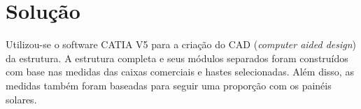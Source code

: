 
\section{Solução}

Utilizou-se o software CATIA V5 para a criação do CAD (\textit{computer aided design}) da estrutura. A estrutura completa e seus módulos separados foram construídos com base nas medidas das caixas comerciais e hastes selecionadas. Além disso, as medidas também foram baseadas para seguir uma proporção com os painéis solares. 

